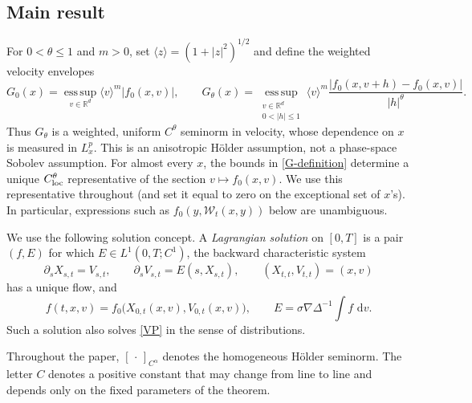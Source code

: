 \documentclass[11pt]{article}
\newcommand{\R}{\mathbb R}
\newcommand{\la}{\langle}
\newcommand{\ra}{\rangle}
\newcommand{\abs}[1]{\left\lvert #1\right\rvert}
\newcommand{\dd}{\,\mathrm d}
\begin{document}
\subsection{Main result}

For $0<\theta\leq1$ and $m>0$,  set
$\la z\ra=(1+\abs z^2)^{1/2}$ and define  the weighted velocity envelopes
 \begin{equation}\label{G-definition}
 G_0(x)=\operatorname*{ess\,sup}_{v\in\R^d}
 \la v\ra^m\abs{f_0(x,v)},
 \qquad
 G_\theta(x)=
 \operatorname*{ess\,sup}_{\substack{v\in\R^d\\0<\abs h\leq1}}
 \la v\ra^m
 \frac{\abs{f_0(x,v+h)-f_0(x,v)}}{\abs h^\theta}.
\end{equation} 
Thus $G_\theta$ is a weighted, uniform $C^\theta$ seminorm in velocity,
whose dependence on $x$ is measured in $L^p_x$.  This is an anisotropic
H\"older assumption, not a phase-space Sobolev assumption.
For almost every $x$, the bounds in \eqref{G-definition} determine a unique
$C^\theta_{\rm loc}$ representative of the section $v\mapsto f_0(x,v)$.
We use this representative throughout (and set it equal to zero on the
exceptional set of $x$'s).  In particular, expressions such as
$f_0(y,\mathcal W_t(x,y))$ below are unambiguous.

We use the following solution concept.  A \emph{Lagrangian solution} on
$[0,T]$ is a pair $(f,E)$ for which  $E\in L^1(0,T;C^1)$, the backward
characteristic system
\begin{equation}\label{characteristics-intro}
 \partial_sX_{s,t}=V_{s,t},\qquad
 \partial_sV_{s,t}=E(s,X_{s,t}),\qquad
 (X_{t,t},V_{t,t})=(x,v)
\end{equation}
has a unique flow, and
\begin{equation*}
 f(t,x,v)=f_0\bigl(X_{0,t}(x,v),V_{0,t}(x,v)\bigr),
 \qquad E=\sigma\nabla\Delta^{-1}\int f\,\dd v.
\end{equation*}
Such a solution also solves
\eqref{VP} in the sense of distributions.

Throughout the paper, $[\,\cdot\,]_{C^\alpha}$
denotes the homogeneous H\"older seminorm.  The letter $C$ denotes a positive
constant that may change from line to line and depends only on the fixed
parameters of the theorem.
\end{document}
